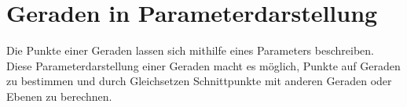 \section{Geraden in Parameterdarstellung}
\label{sec:analytic_geometry_lines}

Die Punkte einer Geraden lassen sich mithilfe eines Parameters beschreiben.
Diese Parameterdarstellung einer Geraden macht es möglich, Punkte auf Geraden
zu bestimmen und durch Gleichsetzen Schnittpunkte mit anderen Geraden oder
Ebenen zu berechnen.



